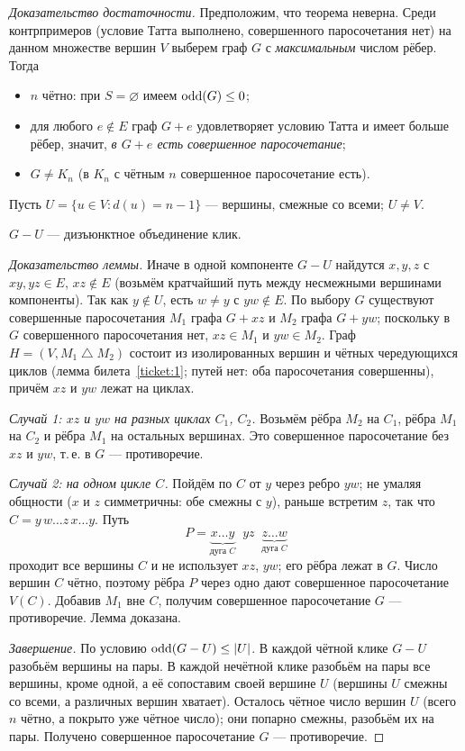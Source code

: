 \begin{proof}[Доказательство достаточности]
Предположим, что теорема неверна. Среди контрпримеров (условие Татта
выполнено, совершенного паросочетания нет) на данном множестве вершин \(V\)
выберем граф \(G\) с \emph{максимальным} числом рёбер. Тогда
\begin{itemize}\tightlist
\item \(n\) чётно: при \(S=\varnothing\) имеем \(\operatorname{odd}(G)\le0\);
\item для любого \(e\notin E\) граф \(G+e\) удовлетворяет условию Татта и имеет
  больше рёбер, значит, \emph{в \(G+e\) есть совершенное паросочетание};
\item \(G\ne K_n\) (в \(K_n\) с чётным \(n\) совершенное паросочетание есть).
\end{itemize}
Пусть \(U=\{u\in V: d(u)=n-1\}\) — вершины, смежные со всеми; \(U\ne V\).

\begin{lemma}\label{lem:cliques}
\(G-U\) — дизъюнктное объединение клик.
\end{lemma}
\textit{Доказательство леммы.} Иначе в одной компоненте \(G-U\) найдутся \(x,y,z\) с \(xy,yz\in E\), \(xz\notin E\)
(возьмём кратчайший путь между несмежными вершинами компоненты). Так как
\(y\notin U\), есть \(w\ne y\) с \(yw\notin E\). По выбору \(G\) существуют совершенные
паросочетания \(M_1\) графа \(G+xz\) и \(M_2\) графа \(G+yw\); поскольку в \(G\)
совершенного паросочетания нет, \(xz\in M_1\) и \(yw\in M_2\).
Граф \(H=(V,M_1\mathbin{\triangle}M_2)\) состоит из изолированных вершин и
чётных чередующихся циклов (лемма билета~\ref{ticket:1}; путей нет: оба
паросочетания совершенны), причём \(xz\) и \(yw\) лежат на циклах.

\emph{Случай 1: \(xz\) и \(yw\) на разных циклах \(C_1\), \(C_2\).} Возьмём рёбра
\(M_2\) на \(C_1\), рёбра \(M_1\) на \(C_2\) и рёбра \(M_1\) на остальных вершинах.
Это совершенное паросочетание без \(xz\) и \(yw\), т.\,е. в \(G\) — противоречие.

\emph{Случай 2: на одном цикле \(C\).} Пойдём по \(C\) от \(y\) через ребро \(yw\);
не умаляя общности (\(x\) и \(z\) симметричны: обе смежны с \(y\)), раньше
встретим \(z\), так что \(C=y\,w\ldots z\,x\ldots y\). Путь
\[
P=\underbrace{x\ldots y}_{\text{дуга }C}\;\; yz\;\;\underbrace{z\ldots w}_{\text{дуга }C}
\]
проходит все вершины \(C\) и не использует \(xz\), \(yw\); его рёбра лежат в \(G\).
Число вершин \(C\) чётно, поэтому рёбра \(P\) через одно дают совершенное
паросочетание \(V(C)\). Добавив \(M_1\) вне \(C\), получим совершенное паросочетание
\(G\) — противоречие. Лемма доказана.


\emph{Завершение.} По условию \(\operatorname{odd}(G-U)\le|U|\). В каждой чётной клике \(G-U\)
разобьём вершины на пары. В каждой нечётной клике разобьём на пары все вершины,
кроме одной, а её сопоставим своей вершине \(U\) (вершины \(U\) смежны со всеми, а
различных вершин хватает). Осталось чётное число вершин \(U\) (всего \(n\) чётно,
а покрыто уже чётное число); они попарно смежны, разобьём их на пары.
Получено совершенное паросочетание \(G\) — противоречие.
\end{proof}


